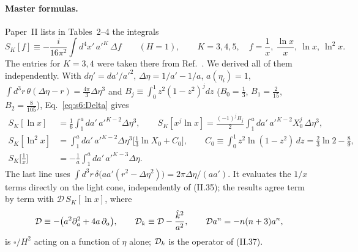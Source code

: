 \documentclass[aps,prd,onecolumn,10pt,nofootinbib,floatfix]{revtex4-2}
\newcommand{\PII}{Paper~II}
\newcommand{\eqII}[1]{(II.#1)}
\newcommand{\Dop}{\mathcal{D}}
\newcommand{\khat}{\hat k}
\begin{document}
\paragraph*{Master formulas.}
\PII{} lists in Tables~2--4 the integrals
\begin{equation}
S_K[f]\equiv-\frac{i}{16\pi^2}\int d^4x'\,a'^K\,\Delta f\qquad(H=1),\qquad K=3,4,5,\quad
f=\frac1x,\ \frac{\ln x}x,\ \ln x,\ \ln^2x .
\label{eq:s6:SK}
\end{equation}
The entries for $K=3,4$ were taken there from Ref.~\cite{ref:Prokopec2007}. We derived all of them independently. With
$d\eta'=da'/a'^2$, $\Delta\eta=1/a'-1/a$, $a(\eta_i)=1$, $\int d^3r\,\theta(\Delta\eta-r)=\frac{4\pi}{3}\Delta\eta^3$
and $B_j\equiv\int_0^1z^2(1-z^2)^jdz$ ($B_0=\frac13$, $B_1=\frac2{15}$, $B_2=\frac8{105}$),
Eq.~\eqref{eq:s6:Delta} gives
\begin{equation}
\begin{aligned}
S_K[\ln x]&=\frac16\int_1^a\!da'\,a'^{K-2}\Delta\eta^3,\qquad
S_K[x^j\ln x]=\frac{(-1)^jB_j}{2}\int_1^a\!da'\,a'^{K-2}X_0^j\,\Delta\eta^3,\\
S_K[\ln^2x]&=\int_1^a\!da'\,a'^{K-2}\Delta\eta^3\Big[\frac13\ln X_0+C_0\Big],\qquad
C_0\equiv\int_0^1\!z^2\ln(1-z^2)\,dz=\frac23\ln2-\frac89,\\
S_K\Big[\frac1x\Big]&=-\frac1a\int_1^a\!da'\,a'^{K-3}\Delta\eta .
\end{aligned}
\label{eq:s6:master}
\end{equation}
The last line uses $\int d^3r\,\delta\big(aa'(r^2-\Delta\eta^2)\big)=2\pi\Delta\eta/(aa')$. It evaluates the $1/x$ terms
directly on the light cone, independently of \eqII{35}; the results agree term by term with $\Dop\,S_K[\ln x]$, where
\begin{equation}
\Dop\equiv-\big(a^2\partial_a^2+4a\,\partial_a\big),\qquad \sixDk\equiv\Dop-\frac{\khat^2}{a^2},
\qquad \Dop a^n=-n(n+3)a^n,
\label{eq:s6:Dop}
\end{equation}
is $\square/H^2$ acting on a function of $\eta$ alone; $\mathcal{D}_k$ is the operator of \eqII{37}.
\end{document}
